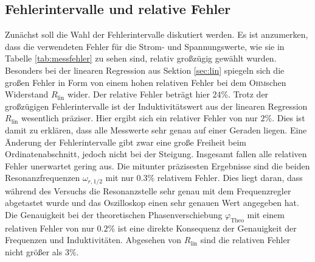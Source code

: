 \documentclass[12pt,a4paper,titlepage,headinclude]{scrartcl}
\numberwithin{equation}{subsection}
\newcommand{\mrm}[1]{\mathrm{#1}}
\newcommand{\person}[1]{\textsc{#1}}
\begin{document}
\subsection{Fehlerintervalle und relative Fehler}
Zunächst soll die Wahl der Fehlerintervalle diskutiert werden. Es ist anzumerken, dass die verwendeten Fehler für die Strom- und Spannungswerte, wie sie in Tabelle \ref{tab:messfehler} zu sehen sind, relativ großzügig gewählt wurden. Besonders bei der linearen Regression aus Sektion \ref{sec:lin} spiegeln sich die großen Fehler in Form von einem hohen relativen Fehler bei dem \person{Ohm}schen Widerstand $R_{\mrm{lin}}$ wider. Der relative Fehler beträgt hier $24\%$. Trotz der großzügigen Fehlerintervalle ist der Induktivitätswert aus der linearen Regression $R_{\mrm{lin}}$ wesentlich präziser. Hier ergibt sich ein relativer Fehler von nur $2\%$. Dies ist damit zu erklären, dass alle Messwerte sehr genau auf einer Geraden liegen. Eine Änderung der Fehlerintervalle gibt zwar eine große Freiheit beim Ordinatenabschnitt, jedoch nicht bei der Steigung.  Insgesamt fallen alle relativen Fehler unerwartet gering aus. Die mitunter präzisesten Ergebnisse sind die beiden Resonanzfrequenzen $\omega_{r,1/2}$ mit nur 0.3\% relativem Fehler. Dies liegt daran, dass während des Versuchs die Resonanzstelle sehr genau mit dem Frequenzregler abgetastet wurde und das Oszilloskop einen sehr genauen Wert angegeben hat. Die Genauigkeit bei der theoretischen Phasenverschiebung $\varphi_{\mrm{Theo}}$ mit einem relativen Fehler von nur $0.2$\% ist eine direkte Konsequenz der Genauigkeit der Frequenzen und Induktivitäten. Abgesehen von $R_{\mrm{lin}}$ sind die relativen Fehler nicht größer als $3\%$.
\end{document}
